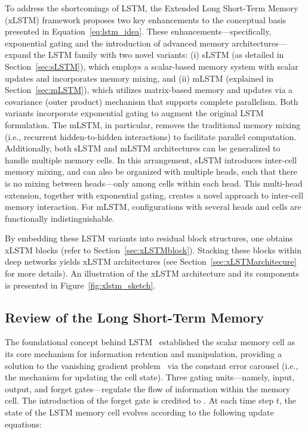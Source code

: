 To address the shortcomings of LSTM, the Extended Long Short-Term Memory (xLSTM) framework proposes two key enhancements to the conceptual basis presented in Equation~\eqref{eq:lstm_idea}. These enhancements—specifically, exponential gating and the introduction of advanced memory architectures—expand the LSTM family with two novel variants: (i) sLSTM (as detailed in Section~\ref{sec:sLSTM}), which employs a scalar-based memory system with scalar updates and incorporates memory mixing, and (ii) mLSTM (explained in Section~\ref{sec:mLSTM}), which utilizes matrix-based memory and updates via a covariance (outer product) mechanism that supports complete parallelism. Both variants incorporate exponential gating to augment the original LSTM formulation. The mLSTM, in particular, removes the traditional memory mixing (i.e., recurrent hidden-to-hidden interactions) to facilitate parallel computation. Additionally, both sLSTM and mLSTM architectures can be generalized to handle multiple memory cells. In this arrangement, sLSTM introduces inter-cell memory mixing, and can also be organized with multiple heads, such that there is no mixing between heads—only among cells within each head. This multi-head extension, together with exponential gating, creates a novel approach to inter-cell memory interaction. For mLSTM, configurations with several heads and cells are functionally indistinguishable.

By embedding these LSTM variants into residual block structures, one obtains xLSTM blocks (refer to Section~\ref{sec:xLSTMblock}). Stacking these blocks within deep networks yields xLSTM architectures (see Section~\ref{sec:xLSTMarchitecure} for more details). An illustration of the xLSTM architecture and its components is presented in Figure~\ref{fig:xlstm_sketch}.

\subsection{Review of the Long Short-Term Memory}
\label{sec:orgLSTM}

The foundational concept behind LSTM~\citep{Hochreiter:91,Hochreiter:97nips,Hochreiter:97} established the scalar memory cell as its core mechanism for information retention and manipulation, providing a solution to the vanishing gradient problem~\citep{Hochreiter:91,Hochreiter:00book} via the constant error carousel (i.e., the mechanism for updating the cell state). Three gating units—namely, input, output, and forget gates—regulate the flow of information within the memory cell. The introduction of the forget gate is credited to \citet{Gers:00}. At each time step $t$, the state of the LSTM memory cell evolves according to the following update equations:

